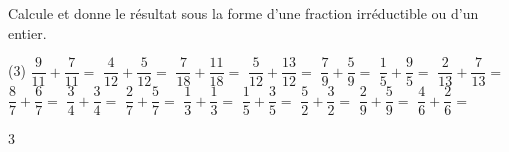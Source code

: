 \documentclass[a4paper,11pt]{report}
\begin{document}
\newpage
\begin{exo}
{Calcule et donne le résultat sous la forme d'une fraction irréductible ou d'un entier. 
\begin{tasks}(3)
\task $\dfrac{9}{11}+\dfrac{7}{11}= $ 
\task $\dfrac{4}{12}+\dfrac{5}{12}=$ 
\task $\dfrac{7}{18}+\dfrac{11}{18}=$
\task $\dfrac{5}{12}+\dfrac{13}{12}=$
\task $\dfrac{7}{9}+\dfrac{5}{9}=$
\task $\dfrac{1}{5}+\dfrac{9}{5}=$
\task $\dfrac{2}{13}+\dfrac{7}{13}=$
\task $\dfrac{8}{7}+\dfrac{6}{7}=$
\task $\dfrac{3}{4}+\dfrac{3}{4}=$
\task $\dfrac{2}{7}+\dfrac{5}{7}=$
\task $\dfrac{1}{3}+\dfrac{1}{3}=$
\task $\dfrac{1}{5}+\dfrac{3}{5}=$
\task  $\dfrac{5}{2}+\dfrac{3}{2}=$
\task   $\dfrac{2}{9}+\dfrac{5}{9}=$
\task $\dfrac{4}{6}+\dfrac{2}{6}=$
\end{tasks}
}{3}
\end{exo}
\end{document}
